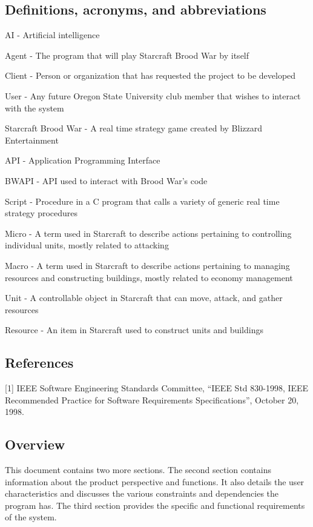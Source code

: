 \documentclass[10pt,letterpaper,onecolumn,draftclsnofoot]{IEEEtran}
\begin{document}
\subsection{Definitions, acronyms, and abbreviations}
AI - Artificial intelligence

Agent - The program that will play Starcraft Brood War by itself

Client - Person or organization that has requested the project to be developed

User - Any future Oregon State University club member that wishes to interact with the system

Starcraft Brood War - A real time strategy game created by Blizzard Entertainment

API - Application Programming Interface

BWAPI - API used to interact with Brood War's code

Script - Procedure in a C program that calls a variety of generic real time strategy procedures

Micro - A term used in Starcraft to describe actions pertaining to controlling individual units, mostly related to attacking

Macro - A term used in Starcraft to describe actions pertaining to managing resources and constructing buildings, mostly related to economy management

Unit - A controllable object in Starcraft that can move, attack, and gather resources

Resource - An item in Starcraft used to construct units and buildings

\subsection{References}
[1] IEEE Software Engineering Standards Committee, “IEEE Std 830-1998, IEEE Recommended Practice for Software Requirements Specifications”, October 20, 1998.

\subsection{Overview}
This document contains two more sections. The second section contains information about the product perspective and functions. It also details the user characteristics and discusses the various constraints and dependencies the program has. The third section provides the specific and functional requirements of the system.
\end{document}
